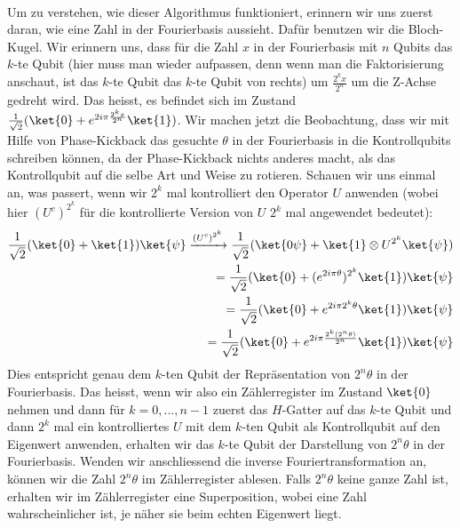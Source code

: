 \paragraph{}
\noindent Um zu verstehen, wie dieser Algorithmus funktioniert, erinnern wir uns zuerst daran, wie eine Zahl in der Fourierbasis aussieht. Dafür benutzen wir die Bloch-Kugel. Wir erinnern uns, dass für die Zahl $x$ in der Fourierbasis mit $n$ Qubits das $k$-te Qubit (hier muss man wieder aufpassen, denn wenn man die Faktorisierung anschaut, ist das $k$-te Qubit das $k$-te Qubit von rechts) um $\frac{2^kx}{2^n}$ um die Z-Achse gedreht wird. Das heisst, es befindet sich im Zustand $\frac{1}{\sqrt{2}}(\ket{0} + e^{2i\pi\frac{2^kx}{2^n}}\ket{1})$. Wir machen jetzt die Beobachtung, dass wir mit Hilfe von Phase-Kickback das gesuchte $\theta$ in der Fourierbasis in die Kontrollqubits schreiben können, da der Phase-Kickback nichts anderes macht, als das Kontrollqubit auf die selbe Art und Weise zu rotieren. Schauen wir uns einmal an, was passert, wenn wir $2^k$ mal kontrolliert den Operator $U$ anwenden (wobei hier $(U^c)^{2^k}$ für die kontrollierte Version von $U$ $2^k$ mal angewendet bedeutet):
\begin{align*}
\frac{1}{\sqrt{2}}(\ket{0} + \ket{1})\ket{\psi} \xrightarrow{(U^c)^{2^k}} \frac{1}{\sqrt{2}}(\ket{0\psi} + \ket{1}\otimes U^{2^k}\ket{\psi}) \\ = \frac{1}{\sqrt{2}}(\ket{0} + (e^{2i\pi\theta})^{2^k}\ket{1})\ket{\psi} \\
= \frac{1}{\sqrt{2}}(\ket{0} + e^{2i\pi2^k\theta}\ket{1})\ket{\psi} \\
= \frac{1}{\sqrt{2}}(\ket{0} + e^{2i\pi\frac{2^k(2^n\theta)}{2^n}}\ket{1})\ket{\psi}
\end{align*}
Dies entspricht genau dem $k$-ten Qubit der Repräsentation von $2^n\theta$ in der Fourierbasis. Das heisst, wenn wir also ein Zählerregister im Zustand $\ket{0}$ nehmen und dann für $k = 0, ..., n - 1$ zuerst das $H$-Gatter auf das $k$-te Qubit und dann $2^k$ mal ein kontrolliertes $U$ mit dem $k$-ten Qubit als Kontrollqubit auf den Eigenwert anwenden, erhalten wir das $k$-te Qubit der Darstellung von $2^n\theta$ in der Fourierbasis. Wenden wir anschliessend die inverse Fouriertransformation an, können wir die Zahl $2^n\theta$ im Zählerregister ablesen. Falls $2^n\theta$ keine ganze Zahl ist, erhalten wir im Zählerregister eine Superposition, wobei eine Zahl wahrscheinlicher ist, je näher sie beim echten Eigenwert liegt.

\paragraph{}

